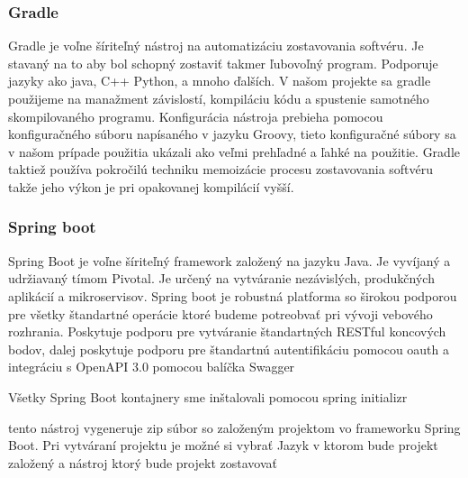 \subsubsection{Gradle} 

Gradle je voľne šíriteľný nástroj na automatizáciu zostavovania softvéru. Je stavaný na to aby bol schopný zostaviť takmer ľubovoľný program. Podporuje jazyky ako java, C++ Python, a mnoho ďalších. V našom projekte sa gradle použijeme na manažment závislostí, kompiláciu kódu a spustenie samotného skompilovaného programu. Konfigurácia nástroja prebieha pomocou konfiguračného súboru napísaného v jazyku Groovy, tieto konfiguračné  súbory sa v našom prípade použitia ukázali ako veľmi prehľadné a ľahké na použitie. Gradle taktiež používa pokročilú techniku memoizácie procesu zostavovania softvéru takže jeho výkon je pri opakovanej kompilácií vyšší.

 
 
\subsubsection{Spring boot} 

Spring Boot je voľne šíriteľný framework založený na jazyku Java. Je vyvíjaný a udržiavaný tímom Pivotal. Je určený na vytváranie nezávislých, produkčných aplikácií a mikroservisov. Spring boot je robustná platforma so širokou podporou pre všetky štandartné operácie ktoré budeme potreobvať pri vývoji vebového rozhrania. Poskytuje podporu pre vytváranie štandartných RESTful koncových bodov, dalej poskytuje podporu pre štandartnú autentifikáciu pomocou \acrshort{oauth} a integráciu s  OpenAPI 3.0 \cite{openapi3} pomocou balíčka Swagger \cite{swagger}






 Všetky Spring Boot kontajnery sme inštalovali pomocou spring initializr \cite{initializr}

tento nástroj vygeneruje zip súbor so založeným projektom vo frameworku Spring Boot. Pri vytváraní projektu je možné si vybrať Jazyk v ktorom bude projekt založený a nástroj ktorý bude projekt zostavovať %


